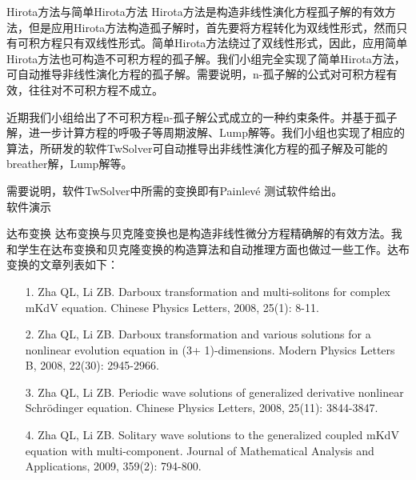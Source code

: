 \documentclass{beamer}
\begin{document}
\begin{frame}{Hirota方法与简单Hirota方法}
Hirota方法是构造非线性演化方程孤子解的有效方法，但是应用Hirota方法构造孤子解时，首先要将方程转化为双线性形式，然而只有可积方程只有双线性形式。简单Hirota方法绕过了双线性形式，因此，应用简单Hirota方法也可构造不可积方程的孤子解。我们小组完全实现了简单Hirota方法，可自动推导非线性演化方程的孤子解。需要说明，n-孤子解的公式对可积方程有效，往往对不可积方程不成立。

近期我们小组给出了不可积方程n-孤子解公式成立的一种约束条件。并基于孤子解，进一步计算方程的呼吸子等周期波解、Lump解等。我们小组也实现了相应的算法，所研发的软件TwSolver可自动推导出非线性演化方程的孤子解及可能的breather解，Lump解等。

需要说明，软件TwSolver中所需的变换即有Painlev\'e 测试软件给出。\\[2mm]

\mbox{}\hskip 3cm 软件演示
  
\end{frame}
\begin{frame}{达布变换}
  达布变换与贝克隆变换也是构造非线性微分方程精确解的有效方法。我和学生在达布变换和贝克隆变换的构造算法和自动推理方面也做过一些工作。达布变换的文章列表如下：
\begin{itemize}
  \item[1.] Zha QL, Li ZB. Darboux transformation and multi-solitons for complex mKdV equation. Chinese Physics Letters, 2008, 25(1): 8-11.
  \item[2.]	Zha QL, Li ZB. Darboux transformation and various solutions for a nonlinear evolution equation in (3+ 1)-dimensions. Modern Physics Letters B, 2008, 22(30): 2945-2966.
  \item[3.]	Zha QL, Li ZB. Periodic wave solutions of generalized derivative nonlinear Schrödinger equation. Chinese Physics Letters, 2008, 25(11): 3844-3847.
  \item[4.] Zha QL, Li ZB. Solitary wave solutions to the generalized coupled mKdV equation with multi-component. Journal of Mathematical Analysis and Applications, 2009, 359(2): 794-800.
\end{itemize}
\end{frame}
\end{document}
